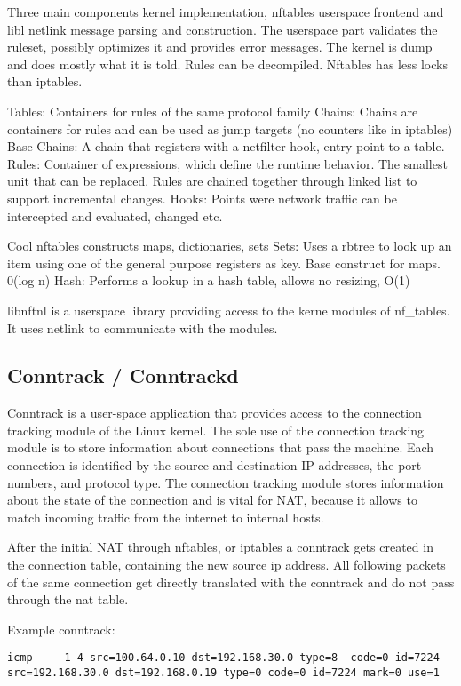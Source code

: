 Three main components kernel implementation, nftables userspace frontend
and libl netlink message parsing and construction. The userspace part
validates the ruleset, possibly optimizes it and provides error
messages. The kernel is dump and does mostly what it is told. Rules can
be decompiled. Nftables has less locks than iptables.

Tables: Containers for rules of the same protocol family Chains: Chains
are containers for rules and can be used as jump targets (no counters
like in iptables) Base Chains: A chain that registers with a netfilter
hook, entry point to a table. Rules: Container of expressions, which
define the runtime behavior. The smallest unit that can be replaced.
Rules are chained together through linked list to support incremental
changes. Hooks: Points were network traffic can be intercepted and
evaluated, changed etc.

Cool nftables constructs maps, dictionaries, sets Sets: Uses a rbtree to
look up an item using one of the general purpose registers as key. Base
construct for maps. 0(log n) Hash: Performs a lookup in a hash table,
allows no resizing, O(1)

libnftnl is a userspace library providing access to the kerne modules of
nf\_tables. It uses netlink to communicate with the modules.

\subsection{Conntrack / Conntrackd}\label{conntrack-conntrackd}

Conntrack is a user-space application that provides access to the
connection tracking module of the Linux kernel. The sole use of the
connection tracking module is to store information about connections
that pass the machine. Each connection is identified by the source and
destination IP addresses, the port numbers, and protocol type. The
connection tracking module stores information about the state of the
connection and is vital for NAT, because it allows to match incoming
traffic from the internet to internal hosts.

After the initial NAT through nftables, or iptables a conntrack gets
created in the connection table, containing the new source ip address.
All following packets of the same connection get directly translated
with the conntrack and do not pass through the nat table.

Example conntrack:

\begin{verbatim}
icmp     1 4 src=100.64.0.10 dst=192.168.30.0 type=8  code=0 id=7224 src=192.168.30.0 dst=192.168.0.19 type=0 code=0 id=7224 mark=0 use=1
\end{verbatim}

